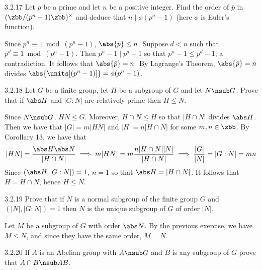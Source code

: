 \begin{exercise}{3.2.17}
    Let $p$ be a prime and let $n$ be a positive integer.
	Find the order of $\bar p$ in $(\zbb/(p^n - 1)\zbb)^\times$ and deduce that $n \mid \phi(p^n - 1)$ (here $\phi$ is Euler's function).
\end{exercise}

\begin{sol}
    Since $p^n \equiv 1 \bmod (p^n - 1)$, $\abs{\bar p} \leq n$.
	Suppose $d < n$ such that $p^d \equiv 1 \bmod (p^n - 1)$.
	Then $p^n - 1 \mid p^d - 1$ so that $p^n - 1 \leq p^d - 1$, a contradiction.
	It follows that $\abs{\bar p} = n$.
	By Lagrange's Theorem, $\abs{\bar p} = n$ divides $\abs{\units[(p^n - 1)]} = \phi(p^n - 1)$.
\end{sol}

\begin{exercise}{3.2.18}
    Let $G$ be a finite group, let $H$ be a subgroup of $G$ and let $N \nsub G$.
	Prove that if $\abs H$ and $|G : N|$ are relatively prime then $H \leq N$.
\end{exercise}

\begin{sol}
    Since $N \nsub G$, $HN \leq G$.
	Moreover, $H \cap N \leq H$ so that $|H \cap N|$ divides $\abs H$.
	Then we have that $|G| = m|HN|$ and $|H| = n|H \cap N|$ for some $m, n \in \zbb$.
	By Corollary 13, we have that
    \[
    	|HN| = \frac{\abs H \abs N}{|H \cap N|} \implies m|HN| = m\frac{n|H \cap N||N|}{|H \cap N|} \implies \frac{|G|}{|N|} = |G : N| = mn
    \]
    Since $(\abs H, |G : N|) = 1$, $n = 1$ so that $\abs H = |H \cap N|$.
	It follows that $H = H \cap N$, hence $H \leq N$.
\end{sol}

\begin{exercise}{3.2.19}
    Prove that if $N$ is a normal subgroup of the finite group $G$ and $(|N|, |G : N|) = 1$ then $N$ is the unique subgroup of $G$ of order $|N|$.
\end{exercise}

\begin{sol}
    Let $M$ be a subgroup of $G$ with order $\abs N$.
	By the previous exercise, we have $M \leq N$, and since they have the same order, $M = N$.
\end{sol}

\begin{spex}{3.2.20}
    If $A$ is an Abelian group with $A \nsub G$ and $B$ is any subgroup of $G$ prove that $A \cap B \nsub AB$.
\end{spex}

